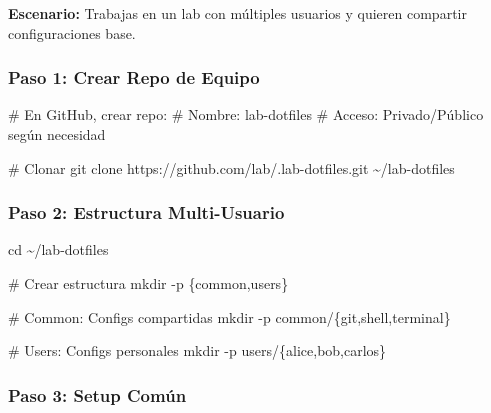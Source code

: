 \documentclass[
  doc,
  floatsintext,
  longtable,
  a4paper,
  nolmodern,
  notxfonts,
  notimes,
  12pt,
  colorlinks=true,linkcolor=blue,citecolor=blue,urlcolor=blue]{apa7}
\newenvironment{Shaded}{\begin{snugshade}}{\end{snugshade}}
\newcommand{\AttributeTok}[1]{\textcolor[rgb]{0.40,0.45,0.13}{#1}}
\newcommand{\BuiltInTok}[1]{\textcolor[rgb]{0.00,0.23,0.31}{#1}}
\newcommand{\CommentTok}[1]{\textcolor[rgb]{0.37,0.37,0.37}{#1}}
\newcommand{\DataTypeTok}[1]{\textcolor[rgb]{0.68,0.00,0.00}{#1}}
\newcommand{\FunctionTok}[1]{\textcolor[rgb]{0.28,0.35,0.67}{#1}}
\newcommand{\NormalTok}[1]{\textcolor[rgb]{0.00,0.23,0.31}{#1}}
\newcommand{\OperatorTok}[1]{\textcolor[rgb]{0.37,0.37,0.37}{#1}}
\begin{document}
\textbf{Escenario:} Trabajas en un lab con múltiples usuarios y quieren
compartir configuraciones base.

\subsubsection{Paso 1: Crear Repo de
Equipo}\label{paso-1-crear-repo-de-equipo}

\begin{Shaded}
\begin{Highlighting}[]
\CommentTok{\# En GitHub, crear repo:}
\CommentTok{\# Nombre: lab{-}dotfiles}
\CommentTok{\# Acceso: Privado/Público según necesidad}

\CommentTok{\# Clonar}
\FunctionTok{git}\NormalTok{ clone https://github.com/lab/.lab{-}dotfiles.git \textasciitilde{}/lab{-}dotfiles}
\end{Highlighting}
\end{Shaded}

\subsubsection{Paso 2: Estructura
Multi-Usuario}\label{paso-2-estructura-multi-usuario}

\begin{Shaded}
\begin{Highlighting}[]
\BuiltInTok{cd}\NormalTok{ \textasciitilde{}/lab{-}dotfiles}

\CommentTok{\# Crear estructura}
\FunctionTok{mkdir} \AttributeTok{{-}p} \DataTypeTok{\{common}\OperatorTok{,}\DataTypeTok{users\}}

\CommentTok{\# Common: Configs compartidas}
\FunctionTok{mkdir} \AttributeTok{{-}p}\NormalTok{ common/}\DataTypeTok{\{git}\OperatorTok{,}\DataTypeTok{shell}\OperatorTok{,}\DataTypeTok{terminal\}}

\CommentTok{\# Users: Configs personales}
\FunctionTok{mkdir} \AttributeTok{{-}p}\NormalTok{ users/}\DataTypeTok{\{alice}\OperatorTok{,}\DataTypeTok{bob}\OperatorTok{,}\DataTypeTok{carlos\}}
\end{Highlighting}
\end{Shaded}

\subsubsection{Paso 3: Setup Común}\label{paso-3-setup-comuxfan}
\end{document}
